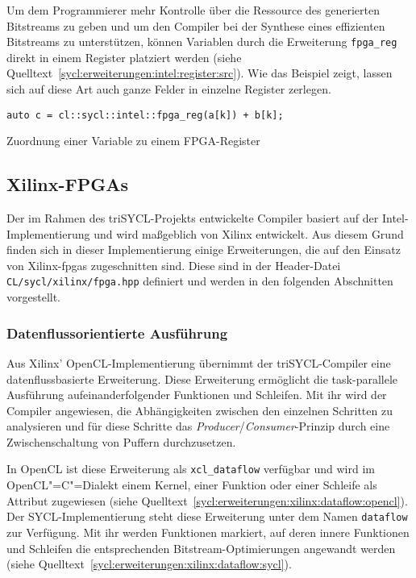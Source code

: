 Um dem Programmierer mehr Kontrolle über die Ressource des generierten
Bitstreams zu geben und um den Compiler bei der Synthese eines effizienten
Bitstreams zu unterstützen, können Variablen durch die Erweiterung
\texttt{fpga\_reg} direkt in einem Register platziert werden (siehe
Quelltext~\ref{sycl:erweiterungen:intel:register:src}). Wie das Beispiel zeigt,
lassen sich auf diese Art auch ganze Felder in einzelne Register zerlegen.

\begin{code}
    \begin{verbatim}
auto c = cl::sycl::intel::fpga_reg(a[k]) + b[k];
    \end{verbatim}
    \caption{Zuordnung einer Variable zu einem FPGA-Register}
    \label{sycl:erweiterungen:intel:register:src}
\end{code}

\subsection{Xilinx-FPGAs}\label{sycl:erweiterungen:xilinx}

Der im Rahmen des triSYCL-Projekts entwickelte Compiler basiert auf der
Intel-Implementierung und wird maßgeblich von Xilinx entwickelt. Aus diesem
Grund finden sich in dieser Implementierung einige Erweiterungen, die auf den
Einsatz von Xilinx-\gls{fpga}s zugeschnitten sind. Diese sind in der
Header-Datei \texttt{CL/sycl/xilinx/fpga.hpp} definiert und werden in den
folgenden Abschnitten vorgestellt.

\subsubsection{Datenflussorientierte Ausführung}
\label{sycl:erweiterungen:xilinx:dataflow}

Aus Xilinx' OpenCL-Implementierung übernimmt der triSYCL-Compiler eine
datenflussbasierte Erweiterung. Diese Erweiterung ermöglicht die task-parallele
Ausführung aufeinanderfolgender Funktionen und Schleifen. Mit ihr wird der
Compiler angewiesen, die Abhängigkeiten zwischen den einzelnen Schritten zu
analysieren und für diese Schritte das
\textit{Producer}/\textit{Consumer}-Prinzip durch eine Zwischenschaltung von
Puffern durchzusetzen. \cite[siehe][70\psqq]{sdaccelopt2019}

In OpenCL ist diese Erweiterung als \texttt{xcl\_dataflow} verfügbar und wird
im OpenCL"=C"=Dialekt einem Kernel, einer Funktion oder einer Schleife als
Attribut zugewiesen (siehe
Quelltext~\ref{sycl:erweiterungen:xilinx:dataflow:opencl}). Der
SYCL-Implementierung steht diese Erweiterung unter dem Namen \texttt{dataflow}
zur Verfügung. Mit ihr werden Funktionen markiert, auf deren innere Funktionen
und Schleifen die entsprechenden Bitstream-Optimierungen angewandt werden (siehe
Quelltext~\ref{sycl:erweiterungen:xilinx:dataflow:sycl}).

